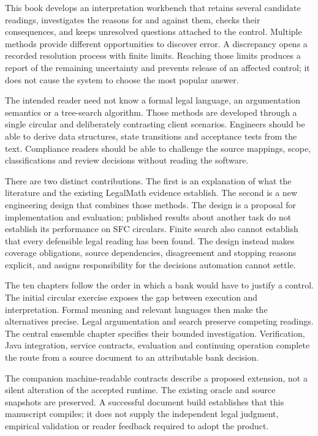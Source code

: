 \documentclass[12pt,a4paper,oneside,openany]{book}
\begin{document}
This book develops an interpretation workbench that retains several candidate
readings, investigates the reasons for and against them, checks their consequences,
and keeps unresolved questions attached to the control. Multiple methods provide
different opportunities to discover error. A discrepancy opens a recorded
resolution process with finite limits. Reaching those limits produces a report
of the remaining uncertainty and prevents release of an affected control; it does
not cause the system to choose the most popular answer.

The intended reader need not know a formal legal language, an argumentation
semantics or a tree-search algorithm. Those methods are developed through a
single circular and deliberately contrasting client scenarios. Engineers should
be able to derive data structures, state transitions and acceptance tests from
the text. Compliance readers should be able to challenge the source mappings,
scope, classifications and review decisions without reading the software.

There are two distinct contributions. The first is an explanation of what the
literature and the existing LegalMath evidence establish. The second is a new
engineering design that combines those methods. The design is a proposal for
implementation and evaluation; published results about another task do not
establish its performance on SFC circulars. Finite search also cannot establish
that every defensible legal reading has been found. The design instead makes
coverage obligations, source dependencies, disagreement and stopping reasons
explicit, and assigns responsibility for the decisions automation cannot settle.

The ten chapters follow the order in which a bank would have to justify a
control. The initial circular exercise exposes the gap between execution and
interpretation. Formal meaning and relevant languages then make the alternatives
precise. Legal argumentation and search preserve competing readings. The central
ensemble chapter specifies their bounded investigation. Verification, Java
integration, service contracts, evaluation and continuing operation complete the
route from a source document to an attributable bank decision.

The companion machine-readable contracts describe a proposed extension, not a
silent alteration of the accepted runtime. The existing oracle and source
snapshots are preserved. A successful document build establishes that this
manuscript compiles; it does not supply the independent legal judgment, empirical
validation or reader feedback required to adopt the product.
\tableofcontents
\mainmatter










\backmatter
\begingroup
\raggedright


\endgroup
\end{document}
